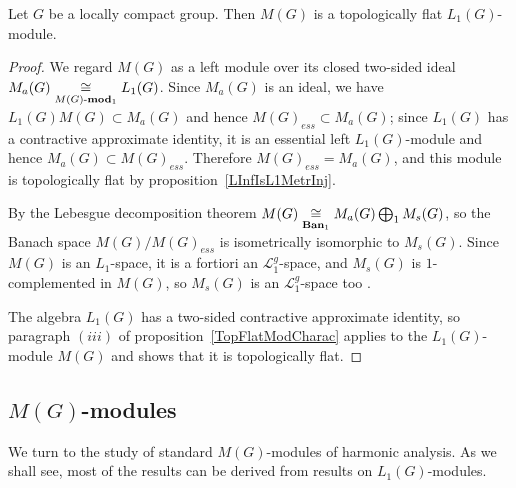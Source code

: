 \begin{proposition}\label{MeasAlgIsL1TopFlat} Let $G$ be a locally compact
group. Then $M(G)$ is a topologically flat $L_1(G)$-module.
\end{proposition}
\begin{proof} We regard $M(G)$ as a left module over its closed two-sided ideal
$M_a(G)\mathrel{\mathop{\cong}\limits_{M(G)\text{-}\mathbf{mod}_1}}L_1(G)$. Since $M_a(G)$ is an ideal, we
have $L_1(G)M(G)\subset M_a(G)$ and hence ${M(G)}_{ess}\subset M_a(G)$; since
$L_1(G)$ has a contractive approximate identity, it is an essential left
$L_1(G)$-module and hence $M_a(G)\subset{M(G)}_{ess}$. Therefore
${M(G)}_{ess}=M_a(G)$, and this module is topologically flat by
proposition~\ref{LInfIsL1MetrInj}.

By the Lebesgue decomposition theorem
$M(G)\mathrel{\mathop{\cong}\limits_{\mathbf{Ban}_1}}M_a(G)\bigoplus_1 M_s(G)$, so the Banach space
$M(G)/{M(G)}_{ess}$ is isometrically isomorphic to $M_s(G)$. Since $M(G)$ is an
$L_1$-space, it is a fortiori an $\mathscr{L}_1^g$-space, and $M_s(G)$ is
$1$-complemented in $M(G)$, so $M_s(G)$ is an $\mathscr{L}_1^g$-space too
\cite[corollary 23.2.1(2)]{DefFloTensNorOpId}.

The algebra $L_1(G)$ has a two-sided contractive approximate identity, so
paragraph $(iii)$ of proposition~\ref{TopFlatModCharac} applies to the
$L_1(G)$-module $M(G)$ and shows that it is topologically flat.
\end{proof}


\subsection{
    \texorpdfstring{$M(G)$}{M(G)}-modules}\label{
SubSectionMGModules}

We turn to the study of standard $M(G)$-modules of harmonic analysis. As we
shall see, most of the results can be derived from results on $L_1(G)$-modules.


